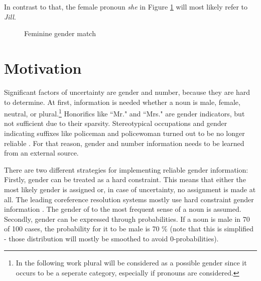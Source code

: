 In contrast to that, the female pronoun \textit{she} in Figure \ref{figure:femmatch} will most likely refer to \textit{Jill}.


\begin{figure}[h]
\centering\sffamily
\caption{Feminine gender match}
	\label{figure:femmatch}
\end{figure}


\section{Motivation}
Significant factors of uncertainty are gender and number, because they are hard to determine. At first, information is needed whether a noun is male, female, neutral, or plural.\footnote{In the following work plural will be considered as a possible gender since it occurs to be a seperate category, especially if pronouns are considered.} Honorifics like “Mr." and “Mrs." are gender indicators, but not sufficient due to their sparsity. Stereotypical occupations and gender indicating suffixes like policeman and policewoman turned out to be no longer reliable \citep{evans2000improving}. For that reason, gender and number information needs to be learned from an external source. 

There are two different strategies for implementing reliable gender information: \\
Firstly, gender can be treated as a hard constraint. This means that either the most likely gender is assigned or, in case of uncertainty, no assignment is made at all. The leading coreference resolution systems mostly use hard constraint gender information \citep{soon2001machine}. The gender of to the most frequent sense of a noun is assumed.\\
Secondly, gender can be expressed through probabilities. If a noun is male in 70 of 100 cases, the probability for it to be male is 70 \% (note that this is simplified - those distribution will mostly be smoothed to avoid 0-probabilities). 

